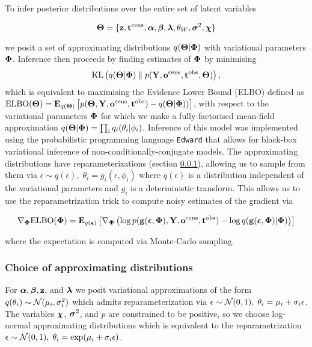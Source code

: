 To infer posterior distributions over the entire set of latent variables 

\begin{equation}
\bm{\Theta} = \{\mathbf{z}, \mathbf{t}^{\text{cens}}, \bm{\alpha}, \bm{\beta}, \bm{\lambda}, \theta_W, \bm{\sigma}^2, \bm{\chi}\} 
\end{equation}

we posit a set of approximating distributions $q(\bm{\Theta} | \bm{\Phi})$ with variational parameters $\bm{\Phi}$. Inference then proceeds by finding estimates of $\bm{\Phi}$ by minimising 
\begin{equation}
\textrm{KL}\left(q(\bm{\Theta} | \bm{\Phi})\;\|\;p(\mathbf{Y}, \mathbf{o}^{\text{cens}}, \mathbf{t}^{\text{obs}}, \bm{\Theta})\right),
\end{equation}
which is equivalent to maximising the Evidence Lower Bound (ELBO) defined as $\text{ELBO}(\bm{\Theta}) = \mathbf{E}_{q(\bm{\Theta})} \left[ p(\bm{\Theta}, \mathbf{Y}, \mathbf{o}^{\text{cens}}, \mathbf{t}^{\text{obs}}) - q(\bm{\Theta} | \bm{\Phi}))\right]$,
with respect to the variational parameters $\bm{\Phi}$ for which we make a fully factorised mean-field approximation $q(\bm{\Theta} | \bm{\Phi}) = \prod_i q_i(\theta_i | \phi_i)$.
Inference of this model was implemented using the probabilistic programming language \texttt{Edward} \citep{Tran2016-ml} that allows for black-box variational inference of non-conditionally-conjugate models. The approximating distributions have reparameterizations (section \ref{sec:approx}), allowing us to sample from them via  $\epsilon \sim q(\epsilon), \; \theta_i = g_i(\epsilon, \phi_i)$ where $q(\epsilon)$ is a distribution independent of the variational parameters and $g_i$ is a deterministic transform. This allows us to use the reparametrization trick \citep{Kingma2013-wo} to compute noisy estimates of the gradient via

\begin{equation}
  \nabla_{\bm{\Phi}} \text{ELBO}(\bm{\Phi}) = \mathbf{E}_{q(\bm{\epsilon})}
  \left[
  \nabla_{\bm{\Phi}} \left( \log p(\mathbf{g}(\bm{\epsilon}, \bm{\Phi}), \mathbf{Y}, \mathbf{o}^{\text{cens}}, \mathbf{t}^{\text{obs}}) - \log q(\mathbf{g}(\bm{\epsilon}, \bm{\Phi}) | \bm{\Phi})\right)
  \right]
\end{equation}

where the expectation is computed via Monte-Carlo sampling.

\subsubsection{Choice of approximating distributions} \label{sec:approx}

For $\bm{\alpha}, \bm{\beta}, \mathbf{z}$, and $\bm{\lambda}$ we posit variational approximations of the form $q(\theta_i) \sim \mathcal{N}(\mu_i, \sigma_i^2)$ which admits reparameterization via $\epsilon \sim \mathcal{N}(0, 1), \; \theta_i = \mu_i + \sigma_i \epsilon$. The variables $\bm{\chi}$, $\bm{\sigma}^2$, and $p$ are constrained to be positive, so we choose log-normal approximating distributions which is equivalent to the reparametrization $\epsilon \sim \mathcal{N}(0, 1), \; \theta_i = \exp(\mu_i + \sigma_i \epsilon)$.

